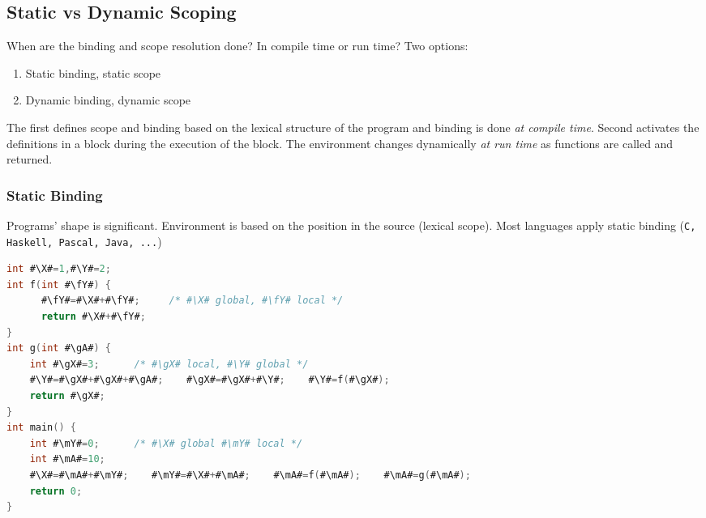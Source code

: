 \begin{multicols}{2}
\setlength{\columnsep}{1.5cm}
\setlength{\columnseprule}{0.2pt}

\subsection{Static vs Dynamic Scoping}

When are the binding and scope resolution done? In compile time or run
time? Two options:
\begin{enumerate}
  \item Static binding, static scope
  \item Dynamic binding, dynamic scope  
\end{enumerate}

The first defines scope and binding based on the lexical structure of the program and binding is done \textit{at compile time}. Second activates the definitions in a block during the execution of the block. The environment changes dynamically \textit{at run time} as functions are called and returned.

\vspace*{\fill}
\columnbreak

\subsubsection{Static Binding}

Programs' shape is significant. Environment is based on the position in the source (lexical scope). Most languages apply static binding (\texttt{C, Haskell, Pascal, Java, ...})

\begin{dummyenv}
\def\X{\color{green!60!black}\bf x}
\def\gX{\color{red!60!black}\bf x}
\def\Y{\color{green!60!black}\bf y}
\def\mY{\color{red!60!black}\bf y}
\def\fY{\color{yellow!60!black}\bf y}
\def\gA{\color{yellow!60!black}\bf a}
\def\mA{\color{red!60!black}\bf a}
\begin{listing}[H]
\begin{lstlisting}[language={C},escapechar=\#]
int #\X#=1,#\Y#=2;
int f(int #\fY#) {
      #\fY#=#\X#+#\fY#;     /* #\X# global, #\fY# local */
      return #\X#+#\fY#;
}
int g(int #\gA#) {
    int #\gX#=3;      /* #\gX# local, #\Y# global */
    #\Y#=#\gX#+#\gX#+#\gA#;    #\gX#=#\gX#+#\Y#;    #\Y#=f(#\gX#);
    return #\gX#;
}
int main() {
    int #\mY#=0;      /* #\X# global #\mY# local */
    int #\mA#=10;
    #\X#=#\mA#+#\mY#;    #\mY#=#\X#+#\mA#;    #\mA#=f(#\mA#);    #\mA#=g(#\mA#);
    return 0;
}
\end{lstlisting}
\caption{}
\label{code:code5}
\end{listing}
\end{dummyenv}

\end{multicols}

